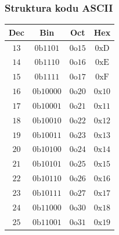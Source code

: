 \documentclass[10pt,t]{beamer}
\newcommand{\btext}{\text{b}}
\newcommand{\otext}{\text{o}}
\newcommand{\xtext}{\text{x}}
\newcommand{\Dtext}{\text{D}}
\newcommand{\Etext}{\text{E}}
\newcommand{\Ftext}{\text{F}}
\begin{document}
\begin{frame}
  \frametitle{Struktura kodu ASCII}


  \begin{center}

    \begin{tabular}{|c|c|c|c|}
      \hline
      Dec & Bin & Oct & Hex \\
      \hline
      $13$ & $0\btext 1101$\hphantom{0} & $0\otext 15$ & $0\xtext \Dtext$ \\
      $14$ & $0\btext 1110$\hphantom{0} & $0\otext 16$ & $0\xtext \Etext$ \\
      $15$ & $0\btext 1111$\hphantom{0} & $0\otext 17$ & $0\xtext \Ftext$ \\
      $16$ & $0\btext 1 0000$ & $0\otext 20$ & $0\xtext 10$ \\
      $17$ & $0\btext 1 0001$ & $0\otext 21$ & $0\xtext 11$ \\
      $18$ & $0\btext 1 0010$ & $0\otext 22$ & $0\xtext 12$ \\
      $19$ & $0\btext 1 0011$ & $0\otext 23$ & $0\xtext 13$ \\
      $20$ & $0\btext 1 0100$ & $0\otext 24$ & $0\xtext 14$ \\
      $21$ & $0\btext 1 0101$ & $0\otext 25$ & $0\xtext 15$ \\
      $22$ & $0\btext 1 0110$ & $0\otext 26$ & $0\xtext 16$ \\
      $23$ & $0\btext 1 0111$ & $0\otext 27$ & $0\xtext 17$ \\
      $24$ & $0\btext 1 1000$ & $0\otext 30$ & $0\xtext 18$ \\
      $25$ & $0\btext 1 1001$ & $0\otext 31$ & $0\xtext 19$ \\
      \hline
    \end{tabular}

  \end{center}

\end{frame}
\end{document}
